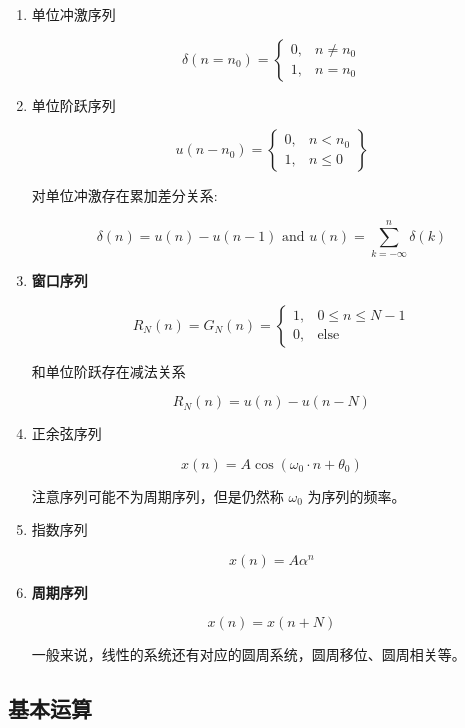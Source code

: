\documentclass[cn,11pt,chinese,black,simple]{../elegantbook}
\begin{document}
\begin{enumerate}
    


    \item 单位冲激序列

\[\delta(n = n_0) = \left\{\begin{aligned}
    0, &{n \neq n_0}\\
    1, &{n = n_0}
\end{aligned}\right.\]


\item 单位阶跃序列

\[
u(n-n_0) = \left\{\begin{aligned}
    0, & n < n_0\\
    1, & n \leq 0
\end{aligned}\right\}
\]

对单位冲激存在累加差分关系:

\[
    \delta(n) = u(n) - u(n-1) \text{ and } u(n) = \sum_{k=-\infty}^n \delta(k)
\]

\item \textbf{窗口序列}

\[
    R_N(n) = G_N(n) = \left\{\begin{aligned}
    1, & 0 \leq n \leq N-1\\
    0, & \text{else}
\end{aligned}\right.
\]

和单位阶跃存在减法关系

\[R_N(n) = u(n) - u(n-N)\]

\item 正余弦序列

\[
x(n) = A \cos(\omega_0 \cdot n + \theta_0)    
\]

注意序列可能不为周期序列，但是仍然称 \(\omega_0\) 为序列的频率。

\item 指数序列

\[x(n) = A \alpha^n\]

\item \textbf{周期序列}

\[x(n) = x(n + N)\]

一般来说，线性的系统还有对应的圆周系统，圆周移位、圆周相关等。


\end{enumerate}

\subsection{基本运算}
\end{document}
